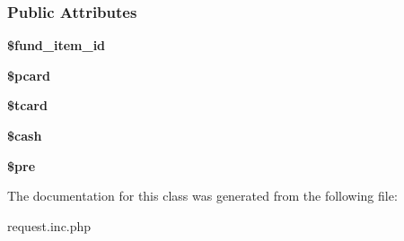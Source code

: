 \subsubsection*{Public Attributes}
\begin{DoxyCompactItemize}
\item 
\hypertarget{classfund__item_abf08e6e8d8c218c4bbb8a3a1053fb2d5}{{\bfseries \$fund\-\_\-item\-\_\-id}}\label{classfund__item_abf08e6e8d8c218c4bbb8a3a1053fb2d5}

\item 
\hypertarget{classfund__item_abd6a959afb9a9bc1af2946bb71714d5a}{{\bfseries \$pcard}}\label{classfund__item_abd6a959afb9a9bc1af2946bb71714d5a}

\item 
\hypertarget{classfund__item_ab35ea22221cb19077b1e1133773fee59}{{\bfseries \$tcard}}\label{classfund__item_ab35ea22221cb19077b1e1133773fee59}

\item 
\hypertarget{classfund__item_aaa36cf70014063ae31fe6cb4990131c5}{{\bfseries \$cash}}\label{classfund__item_aaa36cf70014063ae31fe6cb4990131c5}

\item 
\hypertarget{classfund__item_aa1a2b7aa4da7927075185873e5559886}{{\bfseries \$pre}}\label{classfund__item_aa1a2b7aa4da7927075185873e5559886}

\end{DoxyCompactItemize}


The documentation for this class was generated from the following file\-:\begin{DoxyCompactItemize}
\item 
request.\-inc.\-php\end{DoxyCompactItemize}
